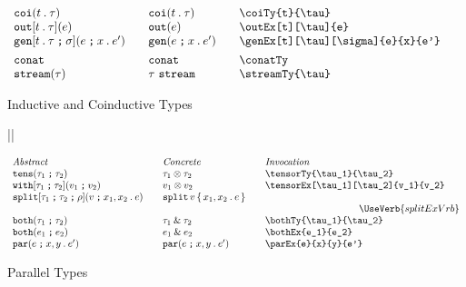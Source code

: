 \documentclass[11pt]{article}
\begin{document}
\begin{figure}
\begin{small}
\begin{displaymath}
\begin{array}{l@{\qquad}l@{\qquad}l@{\qquad}l}
        \coiTy{t}{\tau}                      & \coiTy*{t}{\tau}                    & \verb|\coiTy{t}{\tau}|                         \\
        \outEx[t][\tau]{e}                   & \outEx*{e}                          & \verb|\outEx[t][\tau]{e}|                      \\
        \genEx[t][\tau][\sigma]{e}{x}{e'}    & \genEx*{e}{x}{e'}                   & \verb|\genEx[t][\tau][\sigma]{e}{x}{e'}|       \\[1ex]

        \conatTy                             & \conatTy*                           & \verb|\conatTy|                                \\
        \streamTy{\tau}                      & \streamTy*{\tau}                    & \verb|\streamTy{\tau}|
      \end{array}
    \end{displaymath}
  \end{small}

  \caption{Inductive and Coinductive Types}
  \label{fig:icoi}
\end{figure}

\begin{figure}
  ||
  \begin{small}
    \begin{displaymath}
      \begin{array}{l@{\qquad}l@{\qquad}l@{\qquad}l}
        \textit{Abstract} & \textit{Concrete} & \textit{Invocation} \\
        \tensorTy{\tau_1}{\tau_2}                      & \tensorTy*{\tau_1}{\tau_2} & \verb|\tensorTy{\tau_1}{\tau_2}|                      \\
        \tensorEx[\tau_1][\tau_2]{v_1}{v_2}            & \tensorEx*{v_1}{v_2}       & \verb|\tensorEx[\tau_1][\tau_2]{v_1}{v_2}|                            \\
        \splitEx[\tau_1][\tau_2][\rho]{v}{x_1}{x_2}{e} & \splitEx*{v}{x_1}{x_2}{e}  & \\
        \multicolumn{3}{r}{\UseVerb{splitExVrb}} \\
        \bothTy{\tau_1}{\tau_2}                        & \bothTy*{\tau_1}{\tau_2}   & \verb|\bothTy{\tau_1}{\tau_2}|                        \\
        \bothEx{e_1}{e_2}                              & \bothEx*{e_1}{e_2}         & \verb|\bothEx{e_1}{e_2}|                              \\
        \parEx{e}{x}{y}{e'}                            & \parEx*{e}{x}{y}{e'}       & \verb|\parEx{e}{x}{y}{e'}| 
      \end{array}
    \end{displaymath}
  \end{small}

  \caption{Parallel Types}
  \label{fig:par}
\end{figure}
\end{document}
